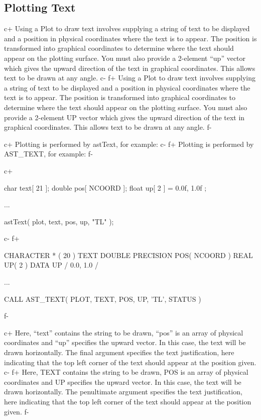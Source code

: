 \documentclass[twoside,11pt]{starlink}
\begin{document}
\subsection{Plotting Text}

c+
Using a Plot to draw text involves supplying a string of text to be
displayed and a position in physical coordinates where the text is to
appear. The position is transformed into graphical coordinates to
determine where the text should appear on the plotting surface. You
must also provide a 2-element ``up'' vector which gives the upward
direction of the text in graphical coordinates. This allows text to be
drawn at any angle.
c-
f+
Using a Plot to draw text involves supplying a string of text to be
displayed and a position in physical coordinates where the text is to
appear. The position is transformed into graphical coordinates to
determine where the text should appear on the plotting surface. You
must also provide a 2-element UP vector which gives the upward
direction of the text in graphical coordinates. This allows text to be
drawn at any angle.
f-

c+
Plotting is performed by astText, for example:
c-
f+
Plotting is performed by AST\_TEXT, for example:
f-

c+
\small
\begin{terminalv}
char text[ 21 ];
double pos[ NCOORD ];
float up[ 2 ] = { 0.0f, 1.0f };

...

astText( plot, text, pos, up, "TL" );
\end{terminalv}
\normalsize
c-
f+
\small
\begin{terminalv}
      CHARACTER * ( 20 ) TEXT
      DOUBLE PRECISION POS( NCOORD )
      REAL UP( 2 )
      DATA UP / 0.0, 1.0 /

      ...

      CALL AST_TEXT( PLOT, TEXT, POS, UP, 'TL', STATUS )
\end{terminalv}
\normalsize
f-

c+
Here, ``text'' contains the string to be drawn, ``pos'' is an array of
physical coordinates and ``up'' specifies the upward vector. In this
case, the text will be drawn horizontally. The final argument
specifies the text justification, here indicating that the top left
corner of the text should appear at the position given.
c-
f+
Here, TEXT contains the string to be drawn, POS is an array of
physical coordinates and UP specifies the upward vector. In this case,
the text will be drawn horizontally. The penultimate argument
specifies the text justification, here indicating that the top left
corner of the text should appear at the position given.
f-
\end{document}
